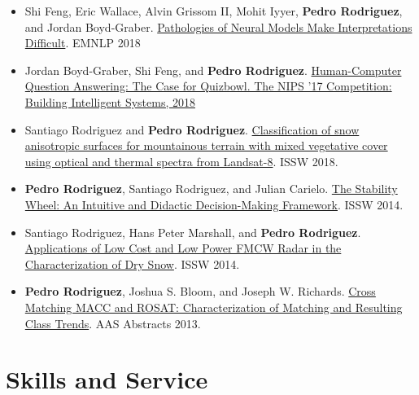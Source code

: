 \documentclass[11pt,a4paper,sans]{moderncv} %
\begin{document}
{\begin{itemize}
    \item Shi Feng, Eric Wallace, Alvin Grissom II, Mohit Iyyer, \textbf{Pedro Rodriguez}, and Jordan Boyd-Graber. \href{https://arxiv.org/abs/1804.07781}{Pathologies of Neural Models Make Interpretations Difficult}. EMNLP 2018
    \item Jordan Boyd-Graber, Shi Feng, and \textbf{Pedro Rodriguez}. \href{https://www.entilzha.io/static/publications/2018_nips_qbcomp.pdf}{Human-Computer Question Answering: The Case for Quizbowl. The NIPS '17 Competition: Building Intelligent Systems, 2018}
	\item Santiago Rodriguez and \textbf{Pedro Rodriguez}. \href{https://arc.lib.montana.edu/snow-science/objects/ISSW2018_P04.4.pdf}{Classification of snow anisotropic surfaces for mountainous terrain with mixed vegetative cover using optical and thermal spectra from Landsat-8}. ISSW 2018.
	\item \textbf{Pedro Rodriguez}, Santiago Rodriguez, and Julian Carielo. \href{http://arc.lib.montana.edu/snow-science/objects/ISSW14_paper_P4.34.pdf}{The Stability Wheel: An Intuitive and Didactic Decision-Making Framework}. ISSW 2014.
	\item Santiago Rodriguez, Hans Peter Marshall, and \textbf{Pedro Rodriguez}. \href{http://citeseerx.ist.psu.edu/viewdoc/download?doi=10.1.1.977.7907&rep=rep1&type=pdf}{Applications of Low Cost and Low Power FMCW Radar in the Characterization of Dry Snow}. ISSW 2014.
	\item \textbf{Pedro Rodriguez}, Joshua S. Bloom, and Joseph W. Richards. \href{http://adsabs.harvard.edu/abs/2013AAS...22135428R}{Cross Matching MACC and ROSAT: Characterization of Matching and Resulting Class Trends}. AAS Abstracts 2013.
  \end{itemize}
}{}

\section{Skills and Service}
\end{document}
